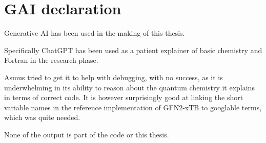 \chapter{GAI declaration}
Generative AI has been used in the making of this thesis.

Specifically ChatGPT has been used as a patient explainer of basic chemistry and Fortran in the research phase.

Asmus tried to get it to help with debugging, with no success, as it is underwhelming in its ability to reason about the quantum chemistry it explains in terms of correct code. 
It is however surprisingly good at linking the short variable names in the reference implementation of GFN2-xTB to googlable terms, which was quite needed.

None of the output is part of the code or this thesis. 



